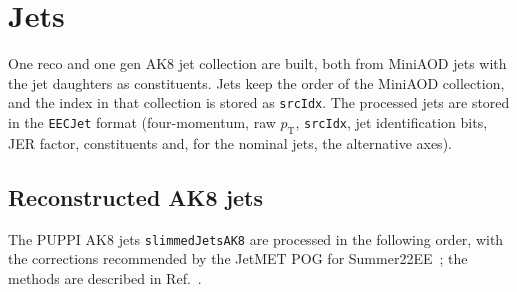 \documentclass[11pt]{article}
\newcommand{\pt}{p_{\mathrm{T}}}
\newcommand{\code}[1]{\texttt{#1}}
\begin{document}
\section{Jets}
\label{sec:jets}

One reco and one gen AK8 jet collection are built, both from MiniAOD jets with the jet daughters as constituents. Jets
keep the order of the MiniAOD collection, and the index in that collection is stored as \code{srcIdx}. The processed
jets are stored in the \code{EECJet} format (four-momentum, raw $\pt$, \code{srcIdx}, jet identification bits, JER
factor, constituents and, for the nominal jets, the alternative axes).

\subsection{Reconstructed AK8 jets}
\label{sec:recojets}
The PUPPI AK8 jets \code{slimmedJetsAK8} are processed in the following order, with the corrections recommended by
the JetMET POG for Summer22EE~\cite{JMEjerc}; the methods are described in Ref.~\cite{CMS:2016lmd}.
\end{document}
